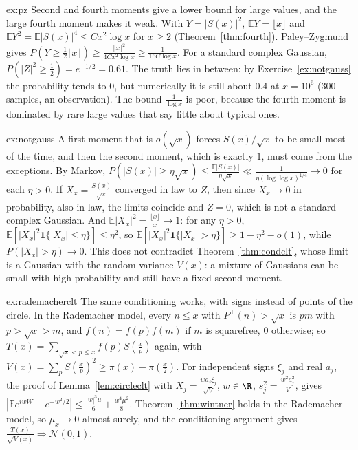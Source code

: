 \begin{solution}{ex:pz}
\idea Second and fourth moments give a lower bound for large values, and the large fourth moment makes it weak.
\writeup With $Y=|S(x)|^2$, $\mathbb EY=\lfloor x\rfloor$ and $\mathbb EY^2=\mathbb E|S(x)|^4\le Cx^2\log x$ for $x\ge2$ (Theorem~\ref{thm:fourth}). Paley--Zygmund gives $P(Y\ge\frac12\lfloor x\rfloor)\ge\frac{\lfloor x\rfloor^2}{4Cx^2\log x}\ge\frac1{16C\log x}$. For a standard complex Gaussian, $P(|Z|^2\ge\frac12)=e^{-1/2}=0.61$. The truth lies in between: by Exercise~\ref{ex:notgauss} the probability tends to $0$, but numerically it is still about $0.4$ at $x=10^6$ ($300$ samples, an observation). The bound $\frac1{\log x}$ is poor, because the fourth moment is dominated by rare large values that say little about typical ones.
\end{solution}

\begin{solution}{ex:notgauss}
\idea A first moment that is $o(\sqrt x)$ forces $S(x)/\sqrt x$ to be small most of the time, and then the second moment, which is exactly $1$, must come from the exceptions.
\writeup By Markov, $P(|S(x)|\ge\eta\sqrt x)\le\frac{\mathbb E|S(x)|}{\eta\sqrt x}\ll\frac1{\eta(\log\log x)^{1/4}}\to0$ for each $\eta>0$. If $X_x=\frac{S(x)}{\sqrt x}$ converged in law to $Z$, then since $X_x\to0$ in probability, also in law, the limits coincide and $Z=0$, which is not a standard complex Gaussian. And $\mathbb E|X_x|^2=\frac{\lfloor x\rfloor}x\to1$: for any $\eta>0$, $\mathbb E[|X_x|^2\mathbf 1\{|X_x|\le\eta\}]\le\eta^2$, so $\mathbb E[|X_x|^2\mathbf 1\{|X_x|>\eta\}]\ge1-\eta^2-o(1)$, while $P(|X_x|>\eta)\to0$. This does not contradict Theorem~\ref{thm:condclt}, whose limit is a Gaussian with the random variance $V(x)$: a mixture of Gaussians can be small with high probability and still have a fixed second moment.
\end{solution}

\begin{solution}{ex:rademacherclt}
\idea The same conditioning works, with signs instead of points of the circle.
\writeup In the Rademacher model, every $n\le x$ with $P^+(n)>\sqrt x$ is $pm$ with $p>\sqrt x>m$, and $f(n)=f(p)f(m)$ if $m$ is squarefree, $0$ otherwise; so $T(x)=\sum_{\sqrt x<p\le x}f(p)S(\frac xp)$ again, with $V(x)=\sum_pS(\frac xp)^2\ge\pi(x)-\pi(\frac x2)$. For independent signs $\xi_j$ and real $a_j$, the proof of Lemma~\ref{lem:circleclt} with $X_j=\frac{wa_j\xi_j}{\sqrt V}$, $w\in\R$, $s_j^2=\frac{w^2a_j^2}V$, gives $|\mathbb Ee^{iwW}-e^{-w^2/2}|\le\frac{|w|^3\mu}6+\frac{w^4\mu^2}8$. Theorem~\ref{thm:wintner} holds in the Rademacher model, so $\mu_x\to0$ almost surely, and the conditioning argument gives $\frac{T(x)}{\sqrt{V(x)}}\Rightarrow\mathcal N(0,1)$.
\end{solution}

